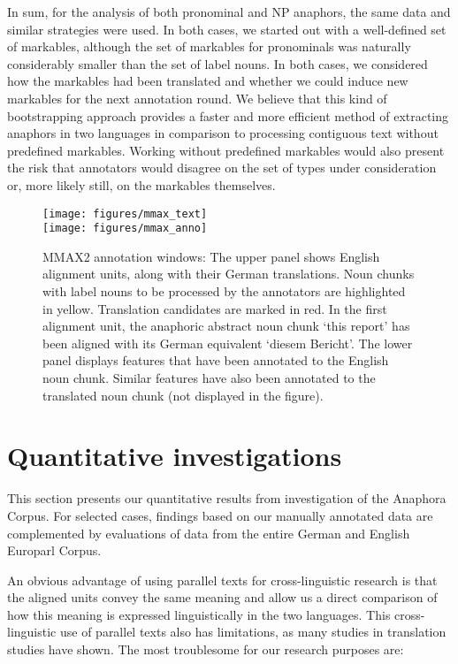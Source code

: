\documentclass[output=paper]{LSP/langsci}
\begin{document}
In sum, for the analysis of both pronominal and NP anaphors, the same data and similar strategies were used. In both cases, we started out with a well-defined set of markables, although the set of markables for pronominals was naturally considerably smaller than the set of label nouns. In both cases, we considered how the markables had been translated and whether we could induce new markables for the next annotation round. We believe that this kind of bootstrapping approach provides a faster and more efficient method of extracting anaphors in two languages in comparison to processing contiguous text without predefined markables. Working without predefined markables would also present the risk that annotators would disagree on the set of types under consideration or, more likely still, on the markables themselves.
\begin{figure}[h] 
\texttt{[image: figures/mmax\_text]} 
\\

\bigskip
\texttt{[image: figures/mmax\_anno]} 
\caption{MMAX2 annotation windows: The 
upper
panel shows English alignment units, along with their German translations. Noun chunks with label nouns  to be processed by the annotators are highlighted in yellow. Translation candidates are marked in red. In the first alignment unit, the anaphoric abstract noun chunk `this report' has been aligned with its German equivalent `diesem Bericht'. 
The
lower
panel displays features that have been annotated to the English noun chunk. Similar features have also been annotated to the translated noun chunk (not displayed in the figure).}\label{fig:mmax}
\end{figure}



\clearpage
\section{Quantitative investigations}
\label{sec:quant}
This section presents our quantitative results from investigation of the Anaphora Corpus. For selected cases, findings based on our manually annotated data are complemented by evaluations of data from the entire German and English Europarl Corpus. 

An obvious advantage of using parallel texts for cross-linguistic research is that the aligned units convey the same meaning and allow us a direct comparison of how this meaning is expressed linguistically in the two languages. This cross-linguistic use of parallel texts also has limitations, as many studies in translation studies have shown. The most troublesome for our research purposes are:
\end{document}
